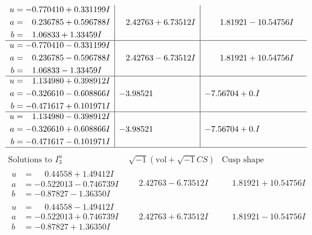 \documentclass[1p]{elsarticle_modified}
\theoremstyle{definition}
\newcommand{\I}{\sqrt{-1}}
\begin{document}
$$\begin{array}{c|c|c}
\begin{aligned}
u &= -0.770410 + 0.331199 I \\
a &= \phantom{-}0.236785 + 0.596788 I \\
b &= \phantom{-}1.06833 + 1.33459 I\end{aligned}
 & \phantom{-}2.42763 + 6.73512 I & \phantom{-}1.81921 - 10.54756 I \\ \hline\begin{aligned}
u &= -0.770410 - 0.331199 I \\
a &= \phantom{-}0.236785 - 0.596788 I \\
b &= \phantom{-}1.06833 - 1.33459 I\end{aligned}
 & \phantom{-}2.42763 - 6.73512 I & \phantom{-}1.81921 + 10.54756 I \\ \hline\begin{aligned}
u &= \phantom{-}1.134980 + 0.398912 I \\
a &= -0.326610 - 0.608866 I \\
b &= -0.471617 + 0.101971 I\end{aligned}
 & -3.98521\phantom{ +0.000000I} & -7.56704 + 0. I\phantom{ +0.000000I} \\ \hline\begin{aligned}
u &= \phantom{-}1.134980 - 0.398912 I \\
a &= -0.326610 + 0.608866 I \\
b &= -0.471617 - 0.101971 I\end{aligned}
 & -3.98521\phantom{ +0.000000I} & -7.56704 + 0. I\phantom{ +0.000000I}\\
 \hline 
 \end{array}$$\newpage$$\begin{array}{c|c|c}  
\text{Solutions to }I^u_{3}& \I (\text{vol} + \sqrt{-1}CS) & \text{Cusp shape}\\
 \hline 
\begin{aligned}
u &= \phantom{-}0.44558 + 1.49412 I \\
a &= -0.522013 - 0.746739 I \\
b &= -0.87827 - 1.36350 I\end{aligned}
 & \phantom{-}2.42763 - 6.73512 I & \phantom{-}1.81921 + 10.54756 I \\ \hline\begin{aligned}
u &= \phantom{-}0.44558 - 1.49412 I \\
a &= -0.522013 + 0.746739 I \\
b &= -0.87827 + 1.36350 I\end{aligned}
 & \phantom{-}2.42763 + 6.73512 I & \phantom{-}1.81921 - 10.54756 I \\ \hline\begin{aligned}

\end{aligned}
\end{array}$$
\end{document}
